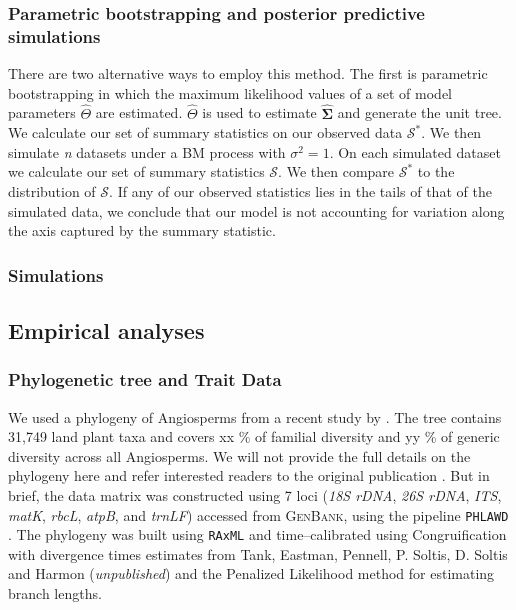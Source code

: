 \documentclass[12pt]{article}
\begin{document}
\subsubsection{Parametric bootstrapping and posterior predictive simulations}

There are two alternative ways to employ this method. The first is parametric bootstrapping in which the maximum likelihood values of a set of model parameters $\hat{\Theta}$ are estimated. $\hat{\Theta}$ is used to estimate $\hat{\mathbf{\Sigma}}$ and generate the unit tree. We calculate our set of summary statistics on our observed data $\mathcal{S}^*$. We then simulate \textit{n} datasets under a BM process with $\sigma^2 = 1$. On each simulated dataset we calculate our set of summary statistics $\mathcal{S}$. We then compare $\mathcal{S}^*$ to the distribution of $\mathcal{S}$. If any of our observed statistics lies in the tails of that of the simulated data, we conclude that our model is not accounting for variation along the axis captured by the summary statistic. 

\subsubsection{Simulations}


\subsection{Empirical analyses}

\subsubsection{Phylogenetic tree and Trait Data}

We used a phylogeny of Angiosperms from a recent study by \citet{ZanneBigTree}. The tree contains 31,749 land plant taxa and covers xx \% of familial diversity and yy \% of generic diversity across all Angiosperms. We will not provide the full details on the phylogeny here and refer interested readers to the original publication \citep{ZanneBigTree}. But in brief, the data matrix was constructed using 7 loci (\textit{18S rDNA}, \textit{26S rDNA}, \textit{ITS}, \textit{matK}, \textit{rbcL}, \textit{atpB}, and \textit{trnLF}) accessed from \textsc{GenBank}, using the pipeline \texttt{PHLAWD} \citep{phlawd}. The phylogeny was built using \texttt{RAxML} \citep{raxml} and time--calibrated using Congruification \citep{Eastmancongruify} with divergence times estimates from Tank, Eastman, Pennell, P. Soltis, D. Soltis and Harmon (\textit{unpublished}) and the Penalized Likelihood method \citep{Sanderson1997, treepl} for estimating branch lengths.
\end{document}
